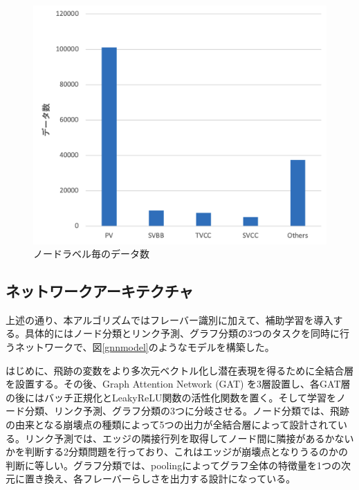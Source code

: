 \begin{figure}[H]
	\begin{center}
 \includegraphics[keepaspectratio, scale=0.3]
 	{Figure/Flavortagging/imbalance.png}
 		\caption{ノードラベル毎のデータ数}
 		\label{node_imb}
	\end{center}
\end{figure}
\subsection{ネットワークアーキテクチャ}
上述の通り、本アルゴリズムではフレーバー識別に加えて、補助学習を導入する。具体的にはノード分類とリンク予測、グラフ分類の3つのタスクを同時に行うネットワークで、図\ref{gnnmodel}のようなモデルを構築した。

はじめに、飛跡の変数をより多次元ベクトル化し潜在表現を得るために全結合層を設置する。その後、Graph Attention Network (GAT) を3層設置し、各GAT層の後にはバッチ正規化とLeakyReLU関数の活性化関数を置く。そして学習をノード分類、リンク予測、グラフ分類の3つに分岐させる。ノード分類では、飛跡の由来となる崩壊点の種類によって5つの出力が全結合層によって設計されている。リンク予測では、エッジの隣接行列を取得してノード間に隣接があるかないかを判断する2分類問題を行っており、これはエッジが崩壊点となりうるのかの判断に等しい。グラフ分類では、poolingによってグラフ全体の特徴量を1つの次元に置き換え、各フレーバーらしさを出力する設計になっている。

